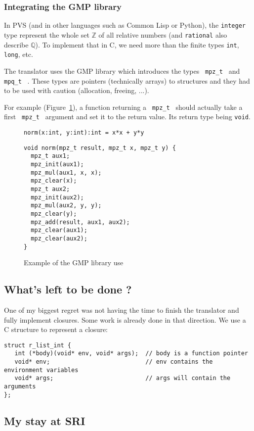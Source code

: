 \documentclass[12pt,a4paper]{article}
\newcommand{\cl}[1]{\texttt{#1}}
\newcommand{\Z}{\mathbb{Z}}
\newcommand{\Q}{\mathbb{Q}}
\newcommand{\mpzt}{ \texttt{ mpz\_t } }
\newcommand{\mpqt}{ \texttt{ mpq\_t } }
\begin{document}
\subsubsection{Integrating the GMP library}
In PVS (and in other languages such as Common Lisp or Python), the \cl{integer} type represent the whole set $\Z$ of all relative numbers (and \cl{rational} also describe $\Q$).
To implement that in C, we need more than the finite types \cl{int}, \cl{long}, etc.

The translator uses the GMP library which introduces the types \mpzt and \mpqt. These types are pointers (technically arrays) to structures and they had to be used with caution (allocation, freeing, ...).

For example (Figure~\ref{fig:exGMP}), a function returning a \mpzt should actually take a first \mpzt argument and set it to the return value. Its return type being \cl{void}.

\begin{figure}[!ht]
\cl{norm(x:int, y:int):int = x*x + y*y}
\begin{lstlisting}
void norm(mpz_t result, mpz_t x, mpz_t y) {
  mpz_t aux1;
  mpz_init(aux1);
  mpz_mul(aux1, x, x);
  mpz_clear(x);
  mpz_t aux2;
  mpz_init(aux2);
  mpz_mul(aux2, y, y);
  mpz_clear(y);
  mpz_add(result, aux1, aux2);
  mpz_clear(aux1);
  mpz_clear(aux2);
}
\end{lstlisting}
\caption{Example of the GMP library use}
\label{fig:exGMP}
\end{figure}




\subsection{What's left to be done ?}

One of my biggest regret was not having the time to finish the translator and fully implement closures.
Some work is already done in that direction. We use a C structure to represent a closure:
\begin{lstlisting}
struct r_list_int {
   int (*body)(void* env, void* args);  // body is a function pointer
   void* env;                           // env contains the environment variables
   void* args;                          // args will contain the arguments
};
\end{lstlisting}



\subsection{My stay at SRI}
\end{document}
